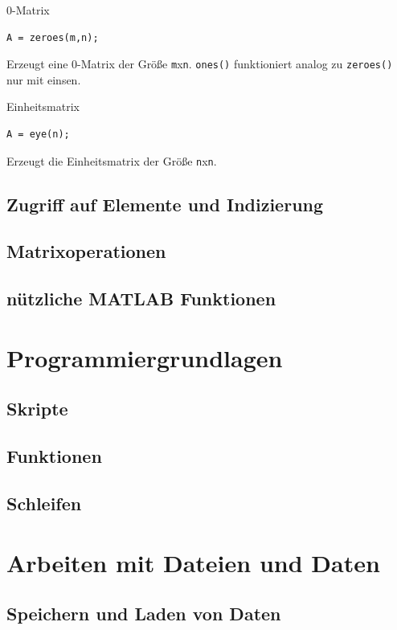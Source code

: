 \documentclass[12pt, a4paper, twoside]{article}
\begin{document}
            \begin{CodeErklaerungBox}{0-Matrix}
                \begin{lstlisting}
A = zeroes(m,n);
                \end{lstlisting}
                \tcblower
                Erzeugt eine 0-Matrix der Größe \texttt{m}x\texttt{n}. \texttt{ones()} funktioniert analog zu \texttt{zeroes()} nur mit einsen.
            \end{CodeErklaerungBox}
            \begin{CodeErklaerungBox}{Einheitsmatrix}
                \begin{lstlisting}
A = eye(n);
                \end{lstlisting}
                \tcblower
                Erzeugt die Einheitsmatrix der Größe \texttt{n}x\texttt{n}.
            \end{CodeErklaerungBox}
        \subsection{Zugriff auf Elemente und Indizierung}
        \subsection{Matrixoperationen}
        \subsection{nützliche MATLAB Funktionen}
    \section{Programmiergrundlagen}
        \subsection{Skripte}
        \subsection{Funktionen}
        \subsection{Schleifen}
    \section{Arbeiten mit Dateien und Daten}
        \subsection{Speichern und Laden von Daten}
\end{document}
